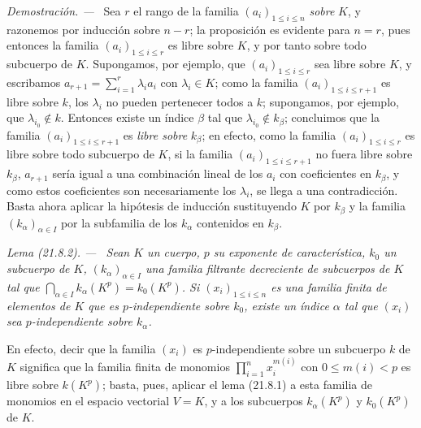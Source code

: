 \documentclass[10pt,oneside]{book}
\makeatletter
\newcommand{\setmanualcurrentlabel}[1]{\def\@currentlabel{#1}}
\newcommand{\oldpage}[2][]{%
  \setcounter{footnote}{0}%
  \marginpar{\scriptsize\textbf{#1}~|~#2}\ignorespaces}
\newenvironment{lemma}[1][]{%
  \setmanualcurrentlabel{#1}\par\medskip\noindent\itshape Lema (#1). ---\ }{\par}
\newenvironment{proof}{%
  \par\medskip\noindent\textit{Demostración. ---\ }}{\par}
\makeatother
\begin{document}
\oldpage[0\textsubscript{IV-1}]{172}
\begin{proof}
Sea $r$ el rango de la familia $(a_i)_{1\leqslant i\leqslant n}$ \emph{sobre} $K$, y
razonemos por inducción sobre $n-r$; la proposición es evidente para $n=r$,
pues entonces la familia $(a_i)_{1\leqslant i\leqslant r}$ es libre sobre $K$, y
por tanto sobre todo subcuerpo de $K$. Supongamos, por ejemplo, que
$(a_i)_{1\leqslant i\leqslant r}$ sea libre sobre $K$, y escribamos
$a_{r+1}=\sum_{i=1}^r\lambda_i a_i$ con $\lambda_i\in K$; como la familia
$(a_i)_{1\leqslant i\leqslant r+1}$ es libre sobre $k$, los $\lambda_i$ no
pueden pertenecer todos a $k$; supongamos, por ejemplo, que
$\lambda_{i_0}\notin k$. Entonces existe un índice $\beta$ tal que
$\lambda_{i_0}\notin k_\beta$; concluimos que la familia
$(a_i)_{1\leqslant i\leqslant r+1}$ es \emph{libre sobre} $k_\beta$; en efecto, como la
familia $(a_i)_{1\leqslant i\leqslant r}$ es libre sobre todo subcuerpo de
$K$, si la familia $(a_i)_{1\leqslant i\leqslant r+1}$ no fuera libre sobre
$k_\beta$, $a_{r+1}$ sería igual a una combinación lineal de los $a_i$ con
coeficientes en $k_\beta$, y como estos coeficientes son necesariamente los
$\lambda_i$, se llega a una contradicción. Basta ahora aplicar la hipótesis de
inducción sustituyendo $K$ por $k_\beta$ y la familia $(k_\alpha)_{\alpha\in I}$
por la subfamilia de los $k_\alpha$ contenidos en $k_\beta$.
\end{proof}

\begin{lemma}[21.8.2]
\label{0.21.8.2-es}
Sean $K$ un cuerpo, $p$ su exponente de característica, $k_0$ un subcuerpo de
$K$, $(k_\alpha)_{\alpha\in I}$ una familia filtrante decreciente de
subcuerpos de $K$ tal que $\bigcap_{\alpha\in I}k_\alpha(K^p)=k_0(K^p)$.
Si $(x_i)_{1\leqslant i\leqslant n}$ es una familia finita de elementos de $K$
que es $p$-independiente sobre $k_0$, existe un índice $\alpha$ tal que $(x_i)$ sea
$p$-independiente sobre $k_\alpha$.

En efecto, decir que la familia $(x_i)$ es $p$-independiente sobre un subcuerpo $k$
de $K$ significa que la familia finita de monomios
$\prod_{i=1}^n x_i^{m(i)}$ con $0\leqslant m(i)<p$ es libre sobre $k(K^p)$;
basta, pues, aplicar el lema (21.8.1) a esta familia de monomios en el
espacio vectorial $V=K$, y a los subcuerpos $k_\alpha(K^p)$ y $k_0(K^p)$
de $K$.
\end{lemma}
\end{document}
